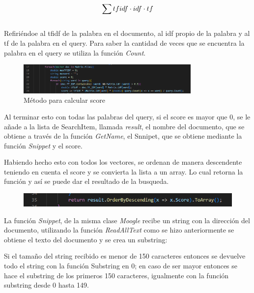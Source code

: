 \documentclass[10pt, letterpaper]{article}
\begin{document}
\begin{equation}
    \centering
  \sum  tfidf \cdot  idf \cdot tf
\end{equation}
\\
Refiriéndoe al tfidf de la palabra en el documento, al idf propio de la palabra y al tf de la palabra en el query. Para saber la cantidad de veces que se encuentra la palabra en el query se
utiliza la función \textit{Count}.

\begin{figure}[h]

    \centering
    \label{imag: score}
    \includegraphics[width=9cm]{Score.png}
    \caption[]{ \footnotesize Método para calcular score}

\end{figure}

Al terminar esto con todas las palabras del query, si el score es mayor que 0, se le añade a la lista de 
SearchItem, llamada \textit{result}, el nombre del documento, que se obtiene a través de la función \textit{GetName},
el Snnipet, que se obtiene mediante la función \textit{Snippet} y el score.

Habiendo hecho esto con todos los vectores, se ordenan de manera descendente teniendo en cuenta el score y 
se convierta la lista a un array. Lo cual retorna la función y así se puede dar el resultado de la busqueda.

\begin{figure}[h]

    \centering
    \includegraphics[width=13cm]{Scoredes.png}
    \caption[]{}

\end{figure}

La función \textit{Snippet}, de la misma clase \textit{Moogle} recibe un string con la dirección del documento, utilizando la
función \textit{ReadAllText} como se hizo anteriormente se obtiene el texto del documento y se crea un substring:

Si el tamaño del string recibido es menor de 150 caracteres entonces se devuelve todo el string con la función
Substring en 0; en caso de ser mayor entonces se hace el substring de los primeros 150 caracteres, 
igualmente con la función substring desde 0 hasta 149.
\end{document}
